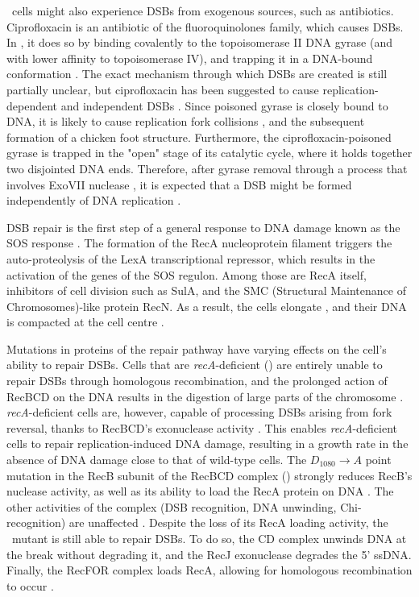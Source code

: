 \ecoli\ cells might also experience DSBs from exo\-genous sources, such as anti\-biotics. Ciprofloxacin is an antibiotic of the fluoro\-quinolones family, which causes DSBs. In \ecoli, it does so by binding covalently to the topoisomerase II DNA gyrase (and with lower affinity to topoisomerase IV), and trapping it in a DNA-bound conformation \cite{Kohanski2010}. The exact mechanism through which DSBs are created is still partially unclear, but ciprofloxacin has been suggested to cause replication-dependent and independent DSBs \cite{Ojkic2020}. Since poisoned gyrase is closely bound to DNA, it is likely to cause replication fork collisions \cite{Wentzell2000, Drlica2008}, and the subsequent formation of a chicken foot structure. Furthermore, the ciprofloxacin-poisoned gyrase is trapped in the "open" stage of its catalytic cycle, where it holds together two disjointed DNA ends. Therefore, after gyrase removal through a process that involves ExoVII nuclease \cite{Huang2021}, it is expected that a DSB might be formed independently of DNA replication \cite{Zhao2006}.

DSB repair is the first step of a general response to DNA damage known as the SOS response \cite{Baharoglu2014}. The formation of the RecA nucleoprotein filament triggers the auto-proteolysis of the LexA transcriptional repressor, which results in the activation of the genes of the SOS regulon. Among those are RecA itself, inhibitors of cell division such as SulA, and the SMC (Structural Maintenance of Chromosomes)-like protein RecN. As a result, the cells elongate \cite{Bos2015}, and their DNA is compacted at the cell centre \cite{Odsbu2014}.

Mutations in proteins of the repair pathway have varying effects on the cell's ability to repair DSBs. Cells that are \emph{recA}-deficient (\dreca) are entirely unable to repair DSBs through homologous recombination, and the prolonged action of RecBCD on the DNA results in the digestion of large parts of the chromosome \cite{Horii1968,Chow2007}. \emph{recA}-deficient cells are, however, capable of processing DSBs arising from fork reversal, thanks to RecBCD's exonuclease activity \cite{Seigneur1998, Michel2001}. This enables \emph{recA}-deficient cells to repair replication-induced DNA damage, resulting in a growth rate in the absence of DNA damage close to that of wild-type cells\cite{delVal2021}. The $D_{1080} \rightarrow A$ point mutation in the RecB subunit of the RecBCD complex (\teneighty) strongly reduces RecB's nuclease activity, as well as its ability to load the RecA protein on DNA \cite{Yu1998, Wang2000}. The other activities of the complex (DSB recognition, DNA unwinding, Chi-recognition) are unaffected \cite{Anderson1999}. Despite the loss of its RecA loading activity, the \geneteneighty\ mutant is still able to repair DSBs. To do so, the \teneighty CD complex unwinds DNA at the break without degrading it, and the RecJ exonuclease degrades the 5' ssDNA. Finally, the RecFOR complex loads RecA, allowing for homologous recombination to occur \cite{Ivancic-Bace_2003}.

